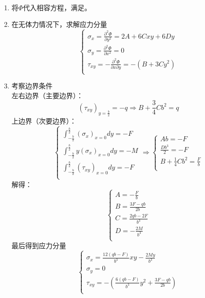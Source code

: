 \begin{remark}
	\quad
	\begin{enumerate}
		\item 将$\varPhi $代入相容方程，满足。
		\item 在无体力情况下，求解应力分量\[\begin{cases}
		\sigma _x=\frac{\partial ^2\varPhi}{\partial y^2}=2A+6Cxy+6Dy\\
		\sigma _y=\frac{\partial ^2\varPhi}{\partial x^2}=0\\
		\tau _{xy}=-\frac{\partial ^2\varPhi}{\partial x\partial y}=-\left( B+3Cy^2 \right)\\
		\end{cases}\]
		\item 考察边界条件\\
		左右边界（主要边界）：\[\left( \tau _{xy} \right) _{y=\frac{b}{2}}=-q\Longrightarrow B+\frac{3}{4}Cb^2=q\]
		上边界（次要边界）：\[\begin{cases}
		\int_{-\frac{b}{2}}^{\frac{b}{2}}{\left( \sigma _x \right) _{x=0}dy}=-F\\
		\int_{-\frac{b}{2}}^{\frac{b}{2}}{y\left( \sigma _x \right) _{x=0}dy}=-M\\
		\int_{-\frac{b}{2}}^{\frac{b}{2}}{\left( \tau _{xy} \right) _{x=0}dy}=-F\\
		\end{cases}\Longrightarrow \begin{cases}
		Ab=-F\\
		\frac{Db^3}{2}=-F\\
		B+\frac{1}{4}Cb^2=\frac{F}{b}\\
		\end{cases}\]
		解得：\[\begin{cases}
		A=-\frac{F}{b}\\
		B=\frac{3F-qb}{2b}\\
		C=\frac{2qb-2F}{b^3}\\
		D=-\frac{2M}{b^3}\\
		\end{cases}\]
		最后得到应力分量\[\begin{cases}
		\sigma _x=\frac{12\left( qb-F \right)}{b^3}xy-\frac{2My}{b^3}\\
		\sigma _y=0\\
		\tau _{xy}=-\left( \frac{6\left( qb-F \right)}{b^3}y^2+\frac{3F-qb}{2b} \right)\\
		\end{cases}\]
	\end{enumerate}
\end{remark}
